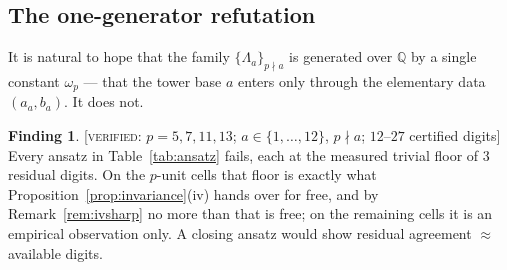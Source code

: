 \documentclass[11pt,reqno]{article}
\newcommand{\QQ}{\mathbb{Q}}
\newcommand{\VER}[1]{{\normalfont\textsc{[verified:} #1\textsc{]}}}
\theoremstyle{plain}
\theoremstyle{definition}
\newtheorem{finding}[theorem]{Finding}
\theoremstyle{remark}
\numberwithin{equation}{section}
\begin{document}
\subsection{The one-generator refutation}\label{ss:onegen}

It is natural to hope that the family $\{\Lambda_a\}_{p\nmid a}$ is generated
over $\QQ$ by a single constant $\omega_p$ --- that the tower base $a$ enters
only through the elementary data $(a_a,b_a)$.  It does not.

\begin{finding}\label{find:onegen}
\VER{$p=5,7,11,13$; $a\in\{1,\dots,12\}$, $p\nmid a$; $12$--$27$ certified
digits}  Every ansatz in Table~\ref{tab:ansatz} fails, each at the measured
trivial floor of $3$ residual digits.  On the $p$-unit cells that floor is
exactly what Proposition~\ref{prop:invariance}(iv) hands over for free, and by
Remark~\ref{rem:ivsharp} no more than that is free; on the remaining cells it is
an empirical observation only.  A closing ansatz would show residual
agreement $\approx$ available digits.
\end{finding}
\end{document}
